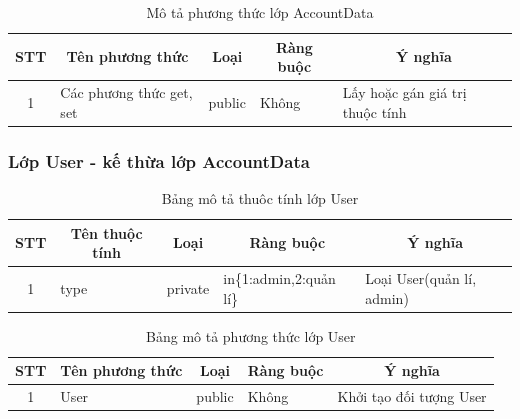 \documentclass[a4paper, 12pt]{article}
\begin{document}
\begin{table}[H]
	\begin{center}
		\begin{tabular}{|c|l|c|l|l|}
			\hline
			STT & \multicolumn{1}{c|}{Tên phương thức} & Loại   & \multicolumn{1}{c|}{Ràng buộc} & \multicolumn{1}{c|}{Ý nghĩa}    \\ \hline
			1   & Các phương thức get, set             & public &             Không                   & Lấy hoặc gán giá trị thuộc tính \\ \hline
			\end{tabular}
		\caption{Mô tả phương thức lớp AccountData}
	\end{center}
\end{table}

\subsubsection{Lớp User - kế thừa lớp AccountData}

\begin{table}[H]
	\begin{center}
		\begin{tabular}{|c|l|c|l|l|}
			\hline
			STT & \multicolumn{1}{c|}{Tên thuộc tính} & Loại    & \multicolumn{1}{c|}{Ràng buộc} & \multicolumn{1}{c|}{Ý nghĩa} \\ \hline
			1   & type                                & private & in\{1:admin,2:quản lí\}        & Loại User(quản lí, admin)    \\ \hline
			\end{tabular}
			\caption{Bảng mô tả thuôc tính lớp User}
	\end{center}
\end{table}

\begin{table}[H]
	\begin{center}
		\begin{tabular}{|c|l|c|l|l|}
			\hline
			STT & \multicolumn{1}{c|}{Tên phương thức} & Loại   & \multicolumn{1}{c|}{Ràng buộc} & \multicolumn{1}{c|}{Ý nghĩa} \\ \hline
			1   & User                                 & public &            Không                    & Khởi tạo đối tượng User      \\ \hline
			\end{tabular}
		\caption{Bảng mô tả phương thức lớp User}
	\end{center}
\end{table}
\end{document}
